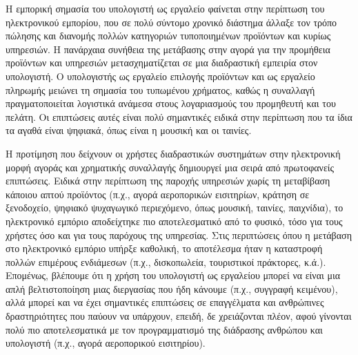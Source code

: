 \documentclass[
]{article}
\begin{document}
Η εμπορική σημασία του υπολογιστή ως εργαλείο φαίνεται στην περίπτωση
του ηλεκτρονικού εμπορίου, που σε πολύ σύντομο χρονικό διάστημα άλλαξε
τον τρόπο πώλησης και διανομής πολλών κατηγοριών τυποποιημένων προϊόντων
και κυρίως υπηρεσιών. Η πανάρχαια συνήθεια της μετάβασης στην αγορά για
την προμήθεια προϊόντων και υπηρεσιών μετασχηματίζεται σε μια
διαδραστική εμπειρία στον υπολογιστή. Ο υπολογιστής ως εργαλείο επιλογής
προϊόντων και ως εργαλείο πληρωμής μειώνει τη σημασία του τυπωμένου
χρήματος, καθώς η συναλλαγή πραγματοποιείται λογιστικά ανάμεσα στους
λογαριασμούς του προμηθευτή και του πελάτη. Οι επιπτώσεις αυτές είναι
πολύ σημαντικές ειδικά στην περίπτωση που τα ίδια τα αγαθά είναι
ψηφιακά, όπως είναι η μουσική και οι ταινίες.

Η προτίμηση που δείχνουν οι χρήστες διαδραστικών συστημάτων στην
ηλεκτρονική μορφή αγοράς και χρηματικής συναλλαγής δημιουργεί μια σειρά
από πρωτοφανείς επιπτώσεις. Ειδικά στην περίπτωση της παροχής υπηρεσιών
χωρίς τη μεταβίβαση κάποιου απτού προϊόντος (π.χ., αγορά αεροπορικών
εισιτηρίων, κράτηση σε ξενοδοχείο, ψηφιακό ψυχαγωγικό περιεχόμενο, όπως
μουσική, ταινίες, παιχνίδια), το ηλεκτρονικό εμπόριο αποδείχτηκε πιο
αποτελεσματικό από το φυσικό, τόσο για τους χρήστες όσο και για τους
παρόχους της υπηρεσίας. Στις περιπτώσεις όπου η μετάβαση στο ηλεκτρονικό
εμπόριο υπήρξε καθολική, το αποτέλεσμα ήταν η καταστροφή πολλών
επιμέρους ενδιάμεσων (π.χ., δισκοπωλεία, τουριστικοί πράκτορες, κ.ά.).
Επομένως, βλέπουμε ότι η χρήση του υπολογιστή ως εργαλείου μπορεί να
είναι μια απλή βελτιστοποίηση μιας διεργασίας που ήδη κάνουμε (π.χ.,
συγγραφή κειμένου), αλλά μπορεί και να έχει σημαντικές επιπτώσεις σε
επαγγέλματα και ανθρώπινες δραστηριότητες που παύουν να υπάρχουν,
επειδή, δε χρειάζονται πλέον, αφού γίνονται πολύ πιο αποτελεσματικά με
τον προγραμματισμό της διάδρασης ανθρώπου και υπολογιστή (π.χ., αγορά
αεροπορικού εισιτηρίου).
\end{document}
